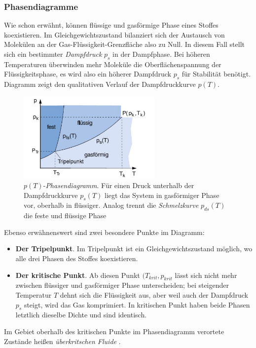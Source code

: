 \documentclass{subfiles}
\begin{document}
\subsubsection{Phasendiagramme}
	Wie schon erwähnt, können flüssige und gasförmige Phase eines Stoffes 		koexistieren. Im Gleichgewichtszustand bilanziert sich der Austausch von Molekülen an der Gas-Flüssigkeit-Grenzfläche also zu Null. In diesem Fall stellt sich ein bestimmter \textit{Dampfdruck} $p_s$ in der Dampfphase. Bei höheren Temperaturen überwinden mehr Moleküle die Oberflächenspannung der Flüssigkeitsphase, es wird also ein höherer Dampfdruck $p_s$ für Stabilität benötigt.\\
	
	\noindent Diagramm zeigt den qualitativen Verlauf der Dampfdruckkurve $p(T)$.
	
	\begin{figure}
		\centering
		\includegraphics[width=7cm]{Bilddateien/Grundlagen/phasendiagramm.jpg}
		\caption{$p(T)$-\textit{Phasendiagramm}. Für einen Druck unterhalb der Dampfdruckkurve $p_s(T)$ liegt das System in gasförmiger Phase vor, oberhalb in flüssiger. Analog trennt die \textit{Schmelzkurve} $p_{ds}(T)$ die feste und flüssige Phase \cite[p.343]{demtroeder}}
		\label{fig:Dampfdruckkurve}
	\end{figure}
	Ebenso erwähnenswert sind zwei besondere Punkte im Diagramm:
	\begin{itemize}
		\item \textbf{Der Tripelpunkt}.	Im Tripelpunkt ist ein Gleichgewichtszustand möglich, wo alle drei Phasen des Stoffes koexistieren.
		\item \textbf{Der kritische Punkt}. Ab diesen Punkt $(T_{krit},p_{krit}$ lässt sich nicht mehr zwischen flüssiger und gasförmiger Phase unterscheiden; bei steigender Temperatur $T$ dehnt sich die Flüssigkeit aus, aber weil auch der Dampfdruck $p_s$ steigt, wird das Gas komprimiert. In kritischen Punkt haben beide Phasen letztlich dieselbe Dichte und sind identisch.
	\end{itemize}
	Im Gebiet oberhalb des kritischen Punkte im Phasendiagramm verortete Zustände heißen \textit{überkritschen Fluide} \cite[p.149]{heintze}.\\
	
\end{document}
